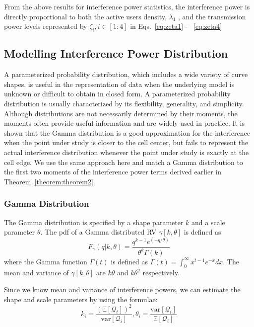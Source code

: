 \par From the above results for interference power statistics, the interference power is directly proportional to both
the active users density, $\lambda_1$ , and the transmission power levels
represented by $\zeta_i , i \in [1:4] $ in Eqs.~\ref{eq:zeta1} - ~\ref{eq:zeta4}

\subsection{Modelling Interference Power Distribution}
A parameterized probability distribution, which includes a
wide variety of curve shapes, is useful in the representation of
data when the underlying model is unknown or difficult to obtain in closed form. A parameterized probability distribution is
usually characterized by its flexibility, generality, and simplicity. Although distributions are not necessarily determined by
their moments, the moments often provide useful information
and are widely used in practice. It is shown that the Gamma
distribution is a good approximation for the interference when
the point under study is closer to the cell center, but fails
to represent the actual interference distribution whenever the
point under study is exactly at the cell edge. We use the same
approach here and match a Gamma distribution to the first
two moments of the interference power terms derived earlier
in Theorem~\ref{theorem:theorem2}.
\subsubsection{Gamma Distribution}
The Gamma distribution is specified by a shape parameter $k$ and a scale parameter $\theta$. The pdf of a Gamma distributed RV $\gamma[k,\theta]$ is defined as 
\begin{equation*}
F_\gamma(q|k,\theta) = \frac{q^{k-1}e^{(-q/\theta)}}{\theta^k\Gamma(k)}
\end{equation*}
where the Gamma function $\Gamma(t)$ is defined as $\Gamma(t) = \int_0^{\infty}x^{t-1}e^{-x}dx$. The mean and variance of $\gamma[k,\theta]$ are $k\theta$ and $k\theta^2$ respectively.
\par
Since we know mean and variance of interference powers, we can estimate the shape and scale parameters by using the formulae:
\begin{equation}
k_i = \frac{(\mathbb{E}[\mathcal{Q}_i])^2}{\text{var}[\mathcal{Q}_i]}, \theta_i =\frac{\text{var}[\mathcal{Q}_i]}{\mathbb{E}[\mathcal{Q}_i]}
\end{equation}

